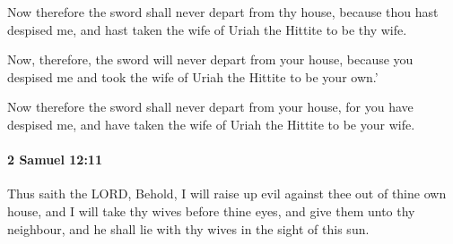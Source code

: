 			\begin{versebox}
					\item[BHS] 
					\item[ASV] Now therefore the sword shall never depart from thy house, because thou hast despised me, and hast taken the wife of Uriah the Hittite to be thy wife.
					\item[NIV] Now, therefore, the sword will never depart from your house, because you despised me and took the wife of Uriah the Hittite to be your own.’
					\item[NRSV] Now therefore the sword shall never depart from your house, for you have despised me, and have taken the wife of Uriah the Hittite to be your wife.
			\end{versebox}

		\paragraph{2 Samuel 12:11} %
			\label{2SAMUEL-12-11}

			Thus saith the LORD, Behold, I will raise up evil against thee out of thine own house, and I will take thy wives before thine eyes, and give them unto thy neighbour, and he shall lie with thy wives in the sight of this sun.

